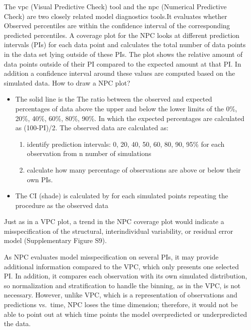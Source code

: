 \documentclass[
]{book}
\providecommand{\tightlist}{%
  \setlength{\itemsep}{0pt}\setlength{\parskip}{0pt}}
\begin{document}
The vpc (Visual Predictive Check) tool and the npc (Numerical Predictive Check) are two closely related model diagnostics tools.It evaluates whether Observed percentiles are within the confidence interval of the corresponding predicted percentiles. A coverage plot for the NPC looks at different prediction intervals (PIs) for each data point and calculates the total number of data points in the data set lying outside of these PIs. The plot shows the relative amount of data points outside of their PI compared to the expected amount at that PI. In addition a confidence interval around these values are computed based on the simulated data.
How to draw a NPC plot?

\begin{itemize}
\item
  The solid line is the The ratio between the observed and expected percentages of data above the upper and below the lower limits of the 0\%, 20\%, 40\%, 60\%, 80\%, 90\%. In which the expected percentages are calculated as (100-PI)/2. The observed data are calculated as:

  \begin{enumerate}
  \def\labelenumi{\arabic{enumi}.}
  \tightlist
  \item
    identify prediction intervals: 0, 20, 40, 50, 60, 80, 90, 95\% for each observation from n number of simulations
  \item
    calculate how many percentage of observations are above or below their own PIs.
  \end{enumerate}
\item
  The CI (shade) is calculated by for each simulated points repeating the procedure as the observed data
\end{itemize}

Just as in a VPC plot, a trend in the NPC coverage plot would indicate a misspecification of the structural, interindividual variability, or residual error model (Supplementary Figure S9).

As NPC evaluates model misspecification on several PIs, it may provide additional information compared to the VPC, which only presents one selected PI. In addition, it compares each observation with its own simulated distribution, so normalization and stratification to handle the binning, as in the VPC, is not necessary. However, unlike VPC, which is a representation of observations and predictions vs.~time, NPC loses the time dimension; therefore, it would not be able to point out at which time points the model overpredicted or underpredicted the data.
\end{document}
